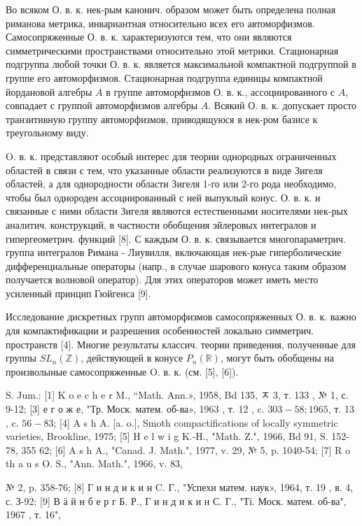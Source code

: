 \documentclass[10pt]{article}
\begin{document}
Во всяком О. в. к. нек-рым канонич. образом может быть определена полная риманова метрика, инвариантная относительно всех его автоморфизмов. Самосопряженные О. в. к. характеризуются тем, что они являются симметрическими пространствами относительно этой метрики. Стационарная подгруппа любой точки О. в. к. является максимальной компактной подгруппой в группе его автоморфизмов. Стационарная подгруппа единицы компактной йордановой алгебры $A$ в группе автоморфизмов О. в. к., ассоциированного с $A$, совпадает с группой автоморфизмов алгебры $A$. Всякий О. в. к. допускает просто транзитивную группу автоморфизмов, приводящуюся в нек-ром базисе к треугольному виду.



O. в. к. представляют особый интерес для теории однородных ограниченных областей в связи с тем, что указанные области реализуются в виде Зигеля областей, а для однородности области Зигеля 1-го или 2-го рода необходимо, чтобы был однороден ассоциированный с ней выпуклый конус. О. в. к. и связанные с ними области Зигеля являются естественными носителями нек-рых аналитич. конструкций, в частности обобщения эйлеровых интегралов и гипергеометрич. функций [8]. С каждым О. в. к. связывается многопараметрич. группа интегралов Римана - Лиувилля, включающая нек-рые гиперболические дифференциальные операторы (напр., в случае шарового конуса таким образом получается волновой оператор). Для этих операторов может иметь место усиленный принцип Гюйгенса [9].



Исследование дискретных групп автоморфизмов самосопряженных О. в. к. важно для компактификации и разрешения особенностей локально симметрич. пространств [4]. Многие результаты классич. теории приведения, полученные для группы $S L_{n}(\mathbb{Z})$, действующей в конусе $P_{n}(\mathbb{R})$, могут быть обобщены на произволыные самосопряженные O. в. к. (см. [5], [6]).



S. Jum.: [1] K o e c h e r M., “Math. Ann.», 1958, Bd 135, ㅈ 3, т. 133 , № 1, с. 9-12; [3] е г о ж е, "Тр. Моск. матем. об-ва», 1963 , т. 12 , c. $303-58 ; 1965$, т. 13 , c. $56-83$; [4] A s h A. [a. o.], Smoth compactifications of locally symmetric varieties, Brookline, 1975; [5] H e l w i g K.-H., "Math. Z.", 1966, Bd 91, S. 152-78, 355 62; [6] A s h A., "Canad. J. Math.", 1977, v. 29, № 5, p. 1040-54; [7] R o th a u s O. S., "Ann. Math.", 1966, v. 83,

№ 2, p. 358-76; [8] Г и н д и к и н C. Г., "Успехи матем. наук», 1964, т. 19 , в. 4, с. З-92; [9] В ӓ й н б е р г Б. Р., Г и н д и к и н С. Г., "Ті. Моск. матем. об-ва", 1967 , т. 16",
\end{document}
